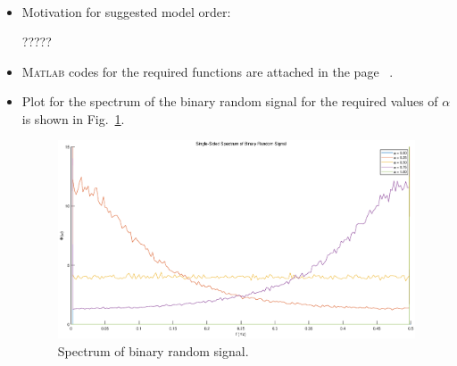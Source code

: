 \documentclass[10pt,a4paper]{article}
\begin{document}
\begin{itemize}
\begin{align*}
	\end{align*}
    \item Motivation for suggested model order:
    \par ?????
    \item \textsc{Matlab} codes for the required functions are attached in the page ~\pageref{matlabCode}.
    \item Plot for the spectrum of the binary random signal for the required values of $\alpha$ is shown in Fig.~\ref{fig:binarySpectrum}.
	\begin{figure}[h]
		\footnotesize
		\centering 
		\includegraphics[width=\columnwidth]{binarySpectrum.eps} 
		\caption{Spectrum of binary random signal.}
		\label{fig:binarySpectrum}
	\end{figure}
\end{itemize}

\end{document}
